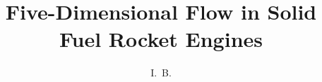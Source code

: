 \documentclass[defaultstyle,11pt]{thesis}
\title{Five-Dimensional Flow in Solid Fuel Rocket Engines}
\author{I.~B.}{Scriptor}
\begin{document}



\nocite{*}		%



\appendix	%


\end{document}
